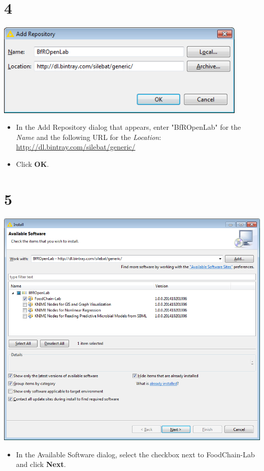 \documentclass{beamer}
\begin{document}
\section{4}
\begin{frame}
	\begin{center}
  		\includegraphics[width=0.9\textwidth]{4.png}
	\end{center}
	\begin{itemize}
		\item In the Add Repository dialog that appears, enter "BfROpenLab" for the \textit{Name} and the following URL for the \textit{Location}: \url{http://dl.bintray.com/silebat/generic/}
		\item Click \textbf{OK}.
	\end{itemize}
\end{frame}

\section{5}
\begin{frame}
	\begin{center}
  		\includegraphics[height=0.7\textheight]{5.png}
	\end{center}
	\begin{itemize}
		\item In the Available Software dialog, select the checkbox next to FoodChain-Lab and click \textbf{Next}.
	\end{itemize}
\end{frame}
\end{document}
